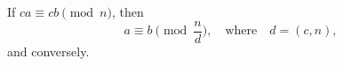 If $ca \equiv cb \pmod{n}$, then
$$a \equiv b \pmod{\frac{n}{d}}, \quad \text{where} \quad d = (c, n),$$
and conversely.
